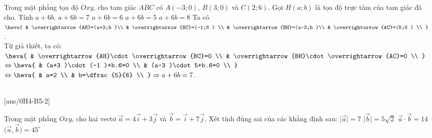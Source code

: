 \begin{ex}%
	Trong mặt phẳng tọa độ $Oxy$, cho tam giác $ABC$ có $A(-3;0 )$, $B(3;0 )$ và $C(2;6 )$. Gọi $H(a;b )$ là tọa độ trực tâm của tam giác đã cho. Tính $a+6b$.
	\choice
	{\True $a+6b=7$}
	{$a+6b=6$}
	{$a+6b=5$}
	{$a+6b=8$}
	\loigiai
	{Ta có $\heva{
			& \overrightarrow{AH}=(a+3;b )\\
			& \overrightarrow{BC}=(-1;6 ) \\
			& \overrightarrow{BH}=(a-3;b )\\
			& \overrightarrow{AC}=(5;6 ) \\
		}$.  \\
		Từ giả thiết, ta có:
		$\heva{
			& \overrightarrow{AH}\cdot\overrightarrow{BC}=0 \\
			& \overrightarrow{BH}\cdot\overrightarrow{AC}=0 \\
		}$ $\Leftrightarrow \heva{
			& (a+3 )\cdot (-1 )+b.6=0 \\
			& (a-3 )\cdot 5+b.6=0 \\
		} $ $\Leftrightarrow \heva{
			& a=2 \\
			& b=\dfrac{5}{6} \\
		} \Rightarrow a+6b=7$. }
\end{ex}


 \\
[ans/0H4-B5-2]

\begin{ex}%
	Trong mặt phẳng $Oxy$, cho hai vectơ $\vec{a}=4\vec{i}+3\vec{j}$ và $\vec{b}=\vec{i}+7\vec{j}$. Xét tính đúng sai của các khẳng định sau:
	\choiceTF
	{$\big|\vec{a}\big|=7$}
	{\True $\big|\vec{b}\big|=5\sqrt{2}$}
	{$\vec{a} \cdot \vec{b}=14$}
	{\True $\big(\vec{a},\vec{b}\big)=45^\circ$}
\end{ex}

